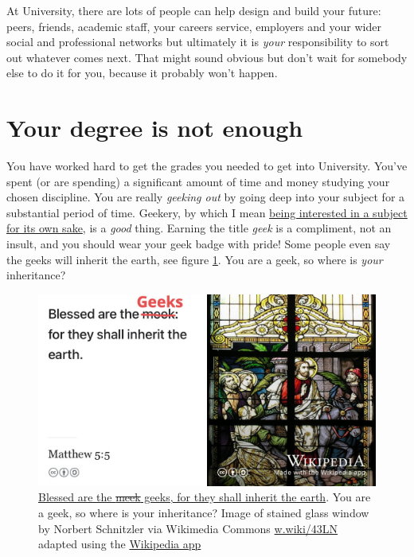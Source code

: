 \documentclass[
]{book}
\begin{document}
At University, there are lots of people can help design and build your future: peers, friends, academic staff, your careers service, employers and your wider social and professional networks but ultimately it is \emph{your} responsibility to sort out whatever comes next. That might sound obvious but don't wait for somebody else to do it for you, because it probably won't happen.

\hypertarget{entitled}{%
\section{Your degree is not enough}\label{entitled}}

You have worked hard to get the grades you needed to get into University. You've spent (or are spending) a significant amount of time and money studying your chosen discipline. You are really \emph{geeking out} by going deep into your subject for a substantial period of time. Geekery, by which I mean \href{https://en.wikipedia.org/wiki/Geek}{being interested in a subject for its own sake}, is a \emph{good} thing. Earning the title \emph{geek} is a compliment, not an insult, and you should wear your geek badge with pride! Some people even say the geeks will inherit the earth, see figure \ref{fig:geekout-fig}. You are a geek, so where is \emph{your} inheritance?

\begin{figure}

{\centering \includegraphics[width=0.99\linewidth]{images/blessed-are-the-geeks} 

}

\caption{\href{https://en.wikipedia.org/wiki/Matthew_5:5}{Blessed are the \sout{meek} geeks, for they shall inherit the earth}. \citep{inherit, blessed} You are a geek, so where is your inheritance? Image of stained glass window by Norbert Schnitzler via Wikimedia Commons \href{https://w.wiki/43LN}{w.wiki/43LN} adapted using the \href{https://apps.apple.com/us/app/wikipedia/id324715238}{Wikipedia app}}\label{fig:geekout-fig}
\end{figure}
\end{document}
